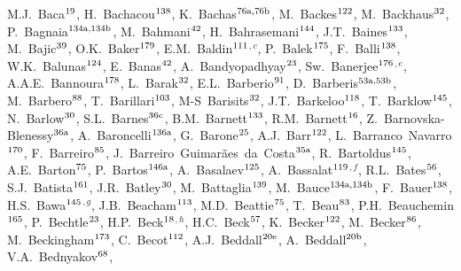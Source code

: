 \begin{flushleft}
M.J.~Baca$^\textrm{\scriptsize 19}$,
H.~Bachacou$^\textrm{\scriptsize 138}$,
K.~Bachas$^\textrm{\scriptsize 76a,76b}$,
M.~Backes$^\textrm{\scriptsize 122}$,
M.~Backhaus$^\textrm{\scriptsize 32}$,
P.~Bagnaia$^\textrm{\scriptsize 134a,134b}$,
M.~Bahmani$^\textrm{\scriptsize 42}$,
H.~Bahrasemani$^\textrm{\scriptsize 144}$,
J.T.~Baines$^\textrm{\scriptsize 133}$,
M.~Bajic$^\textrm{\scriptsize 39}$,
O.K.~Baker$^\textrm{\scriptsize 179}$,
E.M.~Baldin$^\textrm{\scriptsize 111}$$^{,c}$,
P.~Balek$^\textrm{\scriptsize 175}$,
F.~Balli$^\textrm{\scriptsize 138}$,
W.K.~Balunas$^\textrm{\scriptsize 124}$,
E.~Banas$^\textrm{\scriptsize 42}$,
A.~Bandyopadhyay$^\textrm{\scriptsize 23}$,
Sw.~Banerjee$^\textrm{\scriptsize 176}$$^{,e}$,
A.A.E.~Bannoura$^\textrm{\scriptsize 178}$,
L.~Barak$^\textrm{\scriptsize 32}$,
E.L.~Barberio$^\textrm{\scriptsize 91}$,
D.~Barberis$^\textrm{\scriptsize 53a,53b}$,
M.~Barbero$^\textrm{\scriptsize 88}$,
T.~Barillari$^\textrm{\scriptsize 103}$,
M-S~Barisits$^\textrm{\scriptsize 32}$,
J.T.~Barkeloo$^\textrm{\scriptsize 118}$,
T.~Barklow$^\textrm{\scriptsize 145}$,
N.~Barlow$^\textrm{\scriptsize 30}$,
S.L.~Barnes$^\textrm{\scriptsize 36c}$,
B.M.~Barnett$^\textrm{\scriptsize 133}$,
R.M.~Barnett$^\textrm{\scriptsize 16}$,
Z.~Barnovska-Blenessy$^\textrm{\scriptsize 36a}$,
A.~Baroncelli$^\textrm{\scriptsize 136a}$,
G.~Barone$^\textrm{\scriptsize 25}$,
A.J.~Barr$^\textrm{\scriptsize 122}$,
L.~Barranco~Navarro$^\textrm{\scriptsize 170}$,
F.~Barreiro$^\textrm{\scriptsize 85}$,
J.~Barreiro~Guimar\~{a}es~da~Costa$^\textrm{\scriptsize 35a}$,
R.~Bartoldus$^\textrm{\scriptsize 145}$,
A.E.~Barton$^\textrm{\scriptsize 75}$,
P.~Bartos$^\textrm{\scriptsize 146a}$,
A.~Basalaev$^\textrm{\scriptsize 125}$,
A.~Bassalat$^\textrm{\scriptsize 119}$$^{,f}$,
R.L.~Bates$^\textrm{\scriptsize 56}$,
S.J.~Batista$^\textrm{\scriptsize 161}$,
J.R.~Batley$^\textrm{\scriptsize 30}$,
M.~Battaglia$^\textrm{\scriptsize 139}$,
M.~Bauce$^\textrm{\scriptsize 134a,134b}$,
F.~Bauer$^\textrm{\scriptsize 138}$,
H.S.~Bawa$^\textrm{\scriptsize 145}$$^{,g}$,
J.B.~Beacham$^\textrm{\scriptsize 113}$,
M.D.~Beattie$^\textrm{\scriptsize 75}$,
T.~Beau$^\textrm{\scriptsize 83}$,
P.H.~Beauchemin$^\textrm{\scriptsize 165}$,
P.~Bechtle$^\textrm{\scriptsize 23}$,
H.P.~Beck$^\textrm{\scriptsize 18}$$^{,h}$,
H.C.~Beck$^\textrm{\scriptsize 57}$,
K.~Becker$^\textrm{\scriptsize 122}$,
M.~Becker$^\textrm{\scriptsize 86}$,
M.~Beckingham$^\textrm{\scriptsize 173}$,
C.~Becot$^\textrm{\scriptsize 112}$,
A.J.~Beddall$^\textrm{\scriptsize 20e}$,
A.~Beddall$^\textrm{\scriptsize 20b}$,
V.A.~Bednyakov$^\textrm{\scriptsize 68}$,
$$
\end{flushleft}
